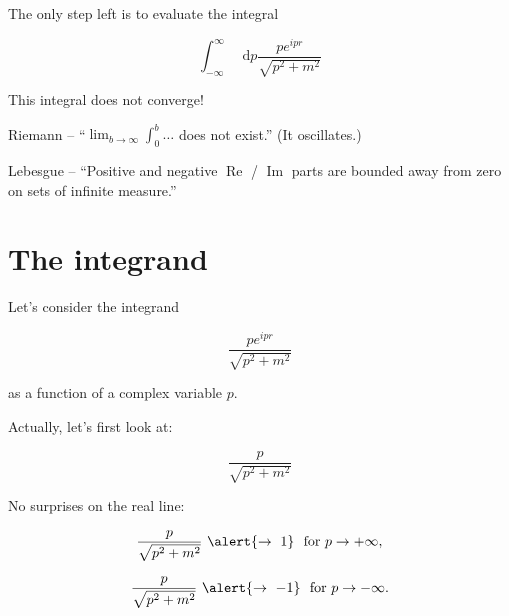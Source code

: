 \documentclass[aspectratio=169]{beamer}
\newcommand{\sqrtpm}{\sqrt{p^2 + m^2}}
\newcommand{\envelope}{\frac{p}{\sqrtpm}}
\newcommand{\integrand}{\frac{p e^{ipr}}{\sqrt{p^2 + m^2}}}
\newcommand{\diffop}{\mathop{}\!\mathrm{d}}
\newcommand{\dip}{\diffop p}
\renewcommand\Re{\operatorname{Re}}
\renewcommand\Im{\operatorname{Im}}
\begin{document}
\begin{frame}
The only step left is to evaluate the integral

\pause
$$\int_{-\infty}^{\infty} \dip \integrand$$

\pause
\medskip
\alert{This integral does not converge!}

\pause
\bigskip
\bigskip
Riemann -- ``$\lim_{b \to \infty} \int_0^b \ldots$ does not exist.'' (It oscillates.)

\pause
\bigskip
Lebesgue -- ``Positive and negative $\Re$ / $\Im$ parts are bounded away from zero on sets of infinite measure.''
\end{frame}


\section{The integrand}

\begin{frame}
Let's consider the integrand

$$\integrand$$

\pause
as a function of a \alert{complex} variable $p$.
\end{frame}


\begin{frame}
Actually, let's first look at:

\pause
$$\envelope$$

\pause
No surprises on the real line:

\pause
$$\envelope \ \alert{\rightarrow \ 1} \ \textrm{ for } p \rightarrow +\infty,$$

\pause
$$\envelope \ \alert{\rightarrow \ -1} \ \textrm{ for } p \rightarrow -\infty.$$

\end{frame}



\end{document}
